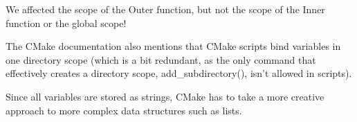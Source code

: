 We affected the scope of the Outer function, but not the scope of the Inner function or the global scope!

The CMake documentation also mentions that CMake scripts bind variables in one directory scope (which is a bit redundant, as the only command that effectively creates a directory scope, add\_subdirectory(), isn't allowed in scripts).

Since all variables are stored as strings, CMake has to take a more creative approach to more complex data structures such as lists.



























